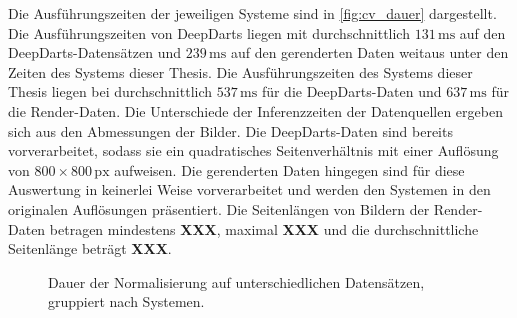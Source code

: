 Die Ausführungszeiten der jeweiligen Systeme sind in \autoref{fig:cv_dauer} dargestellt. Die Ausführungszeiten von DeepDarts liegen mit durchschnittlich $131\,\text{ms}$ auf den DeepDarts-Datensätzen und $239\,\text{ms}$ auf den gerenderten Daten weitaus unter den Zeiten des Systems dieser Thesis. Die Ausführungszeiten des Systems dieser Thesis liegen bei durchschnittlich $537\,\text{ms}$ für die DeepDarts-Daten und $637\,\text{ms}$ für die Render-Daten. Die Unterschiede der Inferenzzeiten der Datenquellen ergeben sich aus den Abmessungen der Bilder. Die DeepDarts-Daten sind bereits vorverarbeitet, sodass sie ein quadratisches Seitenverhältnis mit einer Auflösung von $800 \times 800\,\text{px}$ aufweisen. Die gerenderten Daten hingegen sind für diese Auswertung in keinerlei Weise vorverarbeitet und werden den Systemen in den originalen Auflösungen präsentiert. Die Seitenlängen von Bildern der Render-Daten betragen mindestens \textbf{XXX}, maximal \textbf{XXX} und die durchschnittliche Seitenlänge beträgt \textbf{XXX}.


\begin{figure}
    \centering
    \caption{Dauer der Normalisierung auf unterschiedlichen Datensätzen, gruppiert nach Systemen.}
    \label{fig:cv_dauer}
\end{figure}

